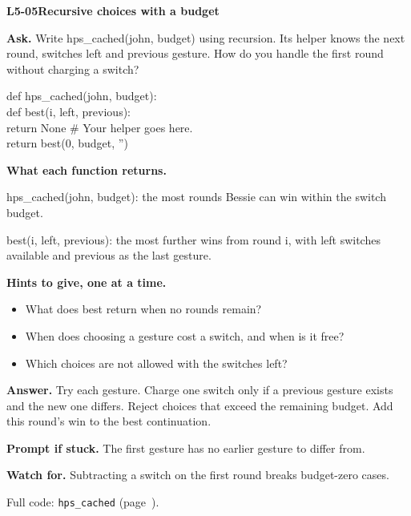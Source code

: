 \documentclass[11pt,a4paper]{article}
\begin{document}
\par\medskip
\noindent\begin{minipage}{\textwidth}
{\color{teal}\textbf{L5-05}}\quad \textbf{Recursive choices with a budget}\par\smallskip
\textbf{Ask.} Write hps\_cached(john, budget) using recursion. Its helper knows the next round, switches left and previous gesture. How do you handle the first round without charging a switch?\par\smallskip
\par{}\par\smallskip\noindent\colorbox{codepaper}{\parbox{\dimexpr\linewidth-2\fboxsep\relax}{\small\ttfamily\raggedright def hps\_cached(john, budget):\\\hspace*{2.4em}def best(i, left, previous):\\\hspace*{4.8em}return None  \# Your helper goes here.\\\hspace*{2.4em}return best(0, budget, '')}}\par
{\small\textbf{What each function returns.}\par hps\_cached(john, budget): the most rounds Bessie can win within the switch budget.\par best(i, left, previous): the most further wins from round i, with left switches available and previous as the last gesture.\par }
{\small\textbf{Hints to give, one at a time.}}\begin{itemize}\item What does best return when no rounds remain?\item When does choosing a gesture cost a switch, and when is it free?\item Which choices are not allowed with the switches left?\end{itemize}
\textbf{Answer.} Try each gesture. Charge one switch only if a previous gesture exists and the new one differs. Reject choices that exceed the remaining budget. Add this round's win to the best continuation.\par\smallskip
\textbf{Prompt if stuck.} The first gesture has no earlier gesture to differ from.\par\smallskip
\textbf{Watch for.} Subtracting a switch on the first round breaks budget-zero cases.\par\smallskip Full code: \texttt{hps\_cached} (page~\pageref{L5-code-hps_cached}).
\end{minipage}\par{}\medskip
\end{document}

